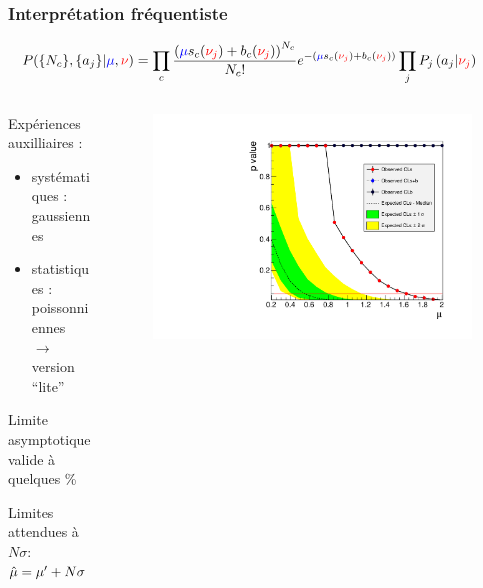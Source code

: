 \begin{frame}
\frametitle{Interpr\'etation fréquentiste}
\begin{small}
\vspace*{-0.5cm}
\[
\hspace*{-0.5cm}
P(\{\nc\},\{a_j\}|\textcolor{blue}{\mu},\textcolor{red}{\nu})=\prod\limits_c\frac{\left(\textcolor{blue}{\mu} \scc(\textcolor{red}{\nu_j})+\bc(\textcolor{red}{\nu_j})\right)^{\nc}}{\nc!}e^{-\left(\textcolor{blue}{\mu} \scc(\textcolor{red}{\nu_j})+\bc(\textcolor{red}{\nu_j})\right)} \prod_j P_j\left(a_j|\textcolor{red}{\nu_j}\right)\]
\end{small}

\begin{columns}
\begin{column}{0.6\textwidth}
\begin{footnotesize}
\begin{maliste}
\item Exp\'eriences auxilliaires :
\begin{itemize}
\item syst\'ematiques : gaussiennes
\item statistiques : poissonniennes\\
$\rightarrow$ version ``lite''\\
\end{itemize}
\vspace*{0.1cm}
\item Limite asymptotique valide \`a \\quelques \%
\vspace*{0.1cm}
\item Limites attendues à $N\sigma$: $\hat{\mu}=\mu'+N\sigma$
\end{maliste}
\end{footnotesize}
\end{column}
\begin{column}{0.4\textwidth}
\begin{figure}[!htb]
\hspace*{-2.2cm}
\includegraphics[width=0.62\linewidth]{Figures/FourTops/pureFrequentistmKK1000GeVScan.pdf}\\

\end{figure}
\end{column}
\end{columns}
\end{frame}

